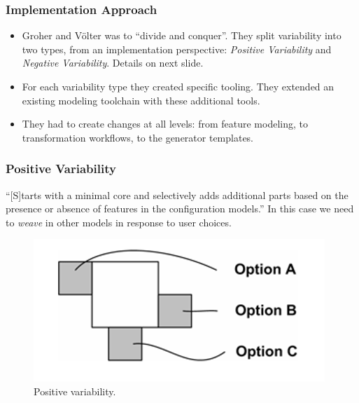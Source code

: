 \documentclass{beamer}
\begin{document}
\begin{frame}
\frametitle{Implementation Approach}

\begin{itemize}

\item Groher and V{\"o}lter was to ``divide and conquer''. They split
  variability into two types, from an implementation perspective:
  \emph{Positive Variability} and \emph{Negative Variability}. Details
  on next slide.

  \pause

\item For each variability type they created specific tooling. They
  extended an existing modeling toolchain with these additional tools.

  \pause

  \item They had to create changes at all levels: from feature
    modeling, to transformation workflows, to the generator templates.

\end{itemize}

\end{frame}

\begin{frame}
\frametitle{Positive Variability}

``[S]tarts with a minimal core and selectively adds additional parts
based on the presence or absence of features in the configuration
models.''\cite{groher2007expressing} In this case we need to
\emph{weave} in other models in response to user choices.

\pause

\begin{figure}
  \centering
  \includegraphics[scale=0.3]{images/positive_variability_voelter.png}
  \caption{Positive variability.\cite{groher2007expressing}}
\end{figure}

\end{frame}
\end{document}
